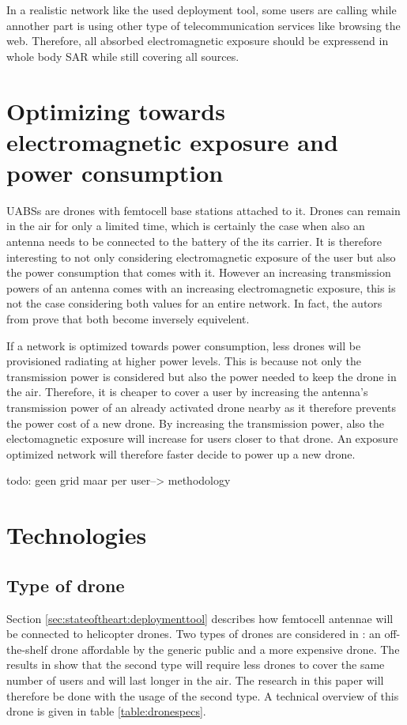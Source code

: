 In a realistic network like the used deployment tool, some users are calling while annother part is using other type of telecommunication services like browsing the web.
Therefore, all absorbed electromagnetic exposure should be expressend in whole body SAR while still covering all sources.

\section{Optimizing towards electromagnetic exposure and power consumption}
\gls{UABS}s are drones with femtocell base stations attached to it. Drones can remain in the air for only a limited time, which is certainly 
the  case when also an antenna needs to be connected to the battery of the its carrier. It is therefore
interesting to not only considering electromagnetic exposure of the user but also the power consumption that comes with it. 
However an increasing transmission powers of an antenna comes with an increasing electromagnetic exposure, this is not the case considering
both values for an entire network. In fact, the autors from \cite{J1}  prove that both become inversely equivelent.

If a network is optimized towards power consumption, less drones will be provisioned radiating at higher power levels. This is because not only 
the transmission power is considered but also the power needed to keep the drone in the air. Therefore, it is cheaper to cover a user by 
increasing the antenna's transmission power of an already activated drone nearby as it therefore prevents the power cost of a new drone.
By increasing the transmission power, also the electomagnetic exposure will increase for users closer to that drone. An exposure optimized
network will therefore faster decide to power up a new drone.

todo: geen grid maar per user--> methodology

\section{Technologies}
\subsection{Type of drone}

Section \ref{sec:stateoftheart:deploymenttool} describes how femtocell antennae will be connected to helicopter drones. Two types of 
drones are considered in \cite{J2}: an off-the-shelf drone affordable by the generic public and a more expensive drone. The results in \cite{J2}
show that the second type will require less drones to cover the same number of users and will last longer in the air. The research in this paper
will therefore be done with the usage of the second type. A technical overview of this drone is given in table \ref{table:dronespecs}.

